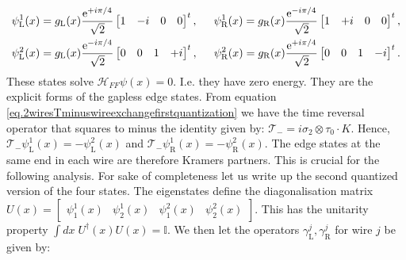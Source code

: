 \begin{align}
\psi^1_{\text{L}}(x) &= g_{\text{L}}(x)\frac{\text{e}^{+i\pi/4}}{\sqrt{2}}\begin{bmatrix} 1 & -i & 0 & 0 \end{bmatrix}^t , \hspace{0.5cm} \psi^1_{\text{R}}(x) = g_{\text{R}}(x)\frac{\text{e}^{-i\pi/4}}{\sqrt{2}}\begin{bmatrix} 1 & +i & 0 & 0 \end{bmatrix}^t, \nonumber \\
\psi^2_{\text{L}}(x) &= g_{\text{L}}(x)\frac{\text{e}^{-i\pi/4}}{\sqrt{2}}\begin{bmatrix} 0 & 0 & 1 & +i \end{bmatrix}^t , \hspace{0.5cm} \psi^2_{\text{R}}(x) = g_{\text{R}}(x)\frac{\text{e}^{+i\pi/4}}{\sqrt{2}}\begin{bmatrix} 0 & 0 & 1 & -i \end{bmatrix}^t.
\end{align}
These states solve $\mathcal{H}_{FF}\psi(x) = 0$. I.e. they have zero energy. They are the explicit forms of the gapless edge states. From equation \eqref{eq.2wiresTminuswireexchangefirstquantization} we have the time reversal operator that squares to minus the identity given by: $\mathcal{T}_- = i\sigma_2\otimes\tau_0 \cdot K$. Hence, $\mathcal{T}_-\psi^1_{\text{L}}(x) = -\psi^2_{\text{L}}(x)$ and $\mathcal{T}_-\psi^1_{\text{R}}(x) = -\psi^2_{\text{R}}(x)$. The edge states at the same end in each wire are therefore Kramers partners. This is crucial for the following analysis. For sake of completeness let us write up the second quantized version of the four states. The eigenstates define the diagonalisation matrix $U(x) = \begin{bmatrix} \psi^{1}_{1}(x) & \psi^{1}_{2}(x) & \psi^{2}_{1}(x) & \psi^{2}_{2}(x) \end{bmatrix}$. This has the unitarity property $\int dx \; U^\dagger(x) U(x) = \mathbb{I}$. We then let the operators $\gamma^{j}_{\text{L}}, \gamma^{j}_{\text{R}}$ for wire $j$ be given by:
